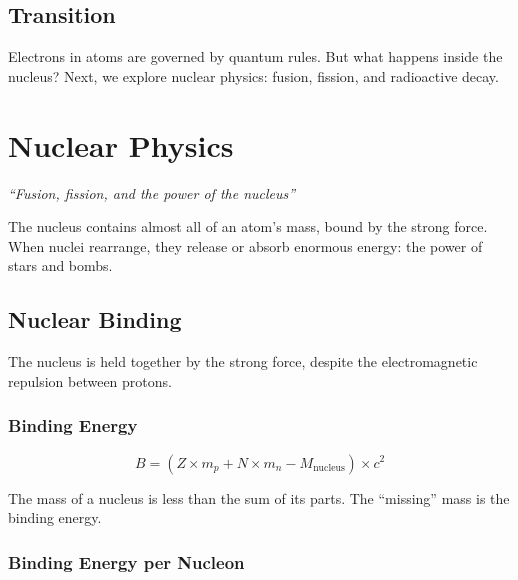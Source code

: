 \documentclass[
  11pt,
  letterpaper,
  twoside,
  openright]{book}
\begin{document}
\section{Transition}\label{transition-2}

Electrons in atoms are governed by quantum rules. But what happens
inside the nucleus? Next, we explore nuclear physics: fusion, fission,
and radioactive decay.

\chapter{Nuclear Physics}\label{sec-nuclear-physics}

\emph{``Fusion, fission, and the power of the nucleus''}

\begin{tcolorbox}[enhanced jigsaw, leftrule=.75mm, title=\textcolor{quarto-callout-note-color}{\faInfo}\hspace{0.5em}{Key Revelation}, bottomrule=.15mm, opacityback=0, coltitle=black, arc=.35mm, colframe=quarto-callout-note-color-frame, colbacktitle=quarto-callout-note-color!10!white, colback=white, titlerule=0mm, breakable, bottomtitle=1mm, toptitle=1mm, rightrule=.15mm, toprule=.15mm, left=2mm, opacitybacktitle=0.6]

The nucleus contains almost all of an atom's mass, bound by the strong
force. When nuclei rearrange, they release or absorb enormous energy:
the power of stars and bombs.

\end{tcolorbox}

\section{Nuclear Binding}\label{nuclear-binding}

The nucleus is held together by the strong force, despite the
electromagnetic repulsion between protons.

\subsection{Binding Energy}\label{binding-energy-1}

\[
B = (Z \times m_p + N \times m_n - M_{\text{nucleus}}) \times c^2
\]

The mass of a nucleus is less than the sum of its parts. The ``missing''
mass is the binding energy.

\subsection{Binding Energy per
Nucleon}\label{binding-energy-per-nucleon}
\end{document}
